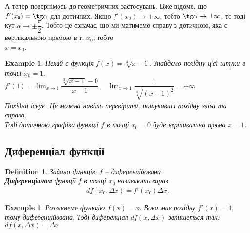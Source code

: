 \documentclass[a4paper, 14pt]{article}
\theoremstyle{theoremdd}
\theoremstyle{theoremdd}
\newtheorem{definition}[theorem]{Definition}
\theoremstyle{theoremdd}
\theoremstyle{theoremdd}
\newtheorem{example}[theorem]{Example}
\theoremstyle{theoremdd}
\theoremstyle{theoremdd}
\theoremstyle{theoremdd}
\theoremstyle{theoremdd}
\begin{document}
А тепер повернімось до геометричних застосувань. Вже відомо, що $f'(x_0) = \tg \alpha$ для дотичних. Якщо $f'(x_0) \to \pm \infty$, тобто $\tg \alpha \to \pm \infty$, то тоді кут $\alpha \to \pm \dfrac{\pi}{2}$. Тобто це означає, що ми матимемо справу з дотичною, яка є вертикальною прямою в т. $x_0$, тобто\\
$x=x_0$.

\begin{example}
Нехай є функція $f(x) = \sqrt[3]{x-1}$. Знайдемо похідну цієї штуки в точці $x_0 = 1$.\\
$f'(1) = \displaystyle \lim_{x \to 1} \dfrac{\sqrt[3]{x-1}-0}{x-1} = \lim_{x \to 1} \dfrac{1}{\sqrt[3]{(x-1)^2}} = + \infty$\\
Похідна існує. Це можна навіть перевірити, пошукавши похідну зліва та справа.\\
Тоді дотичною графіка функції $f$ в точці $x_0 = 0$ буде вертикальна пряма $x = 1$.
\\ \iffalse %
\begin{figure}[H]
\centering
{
\begin{tikzpicture}

\draw[thick, ->] (-3,0)--(3,0) node[anchor = north] {$x$};
\draw[thick, ->] (-1,-2)--(-1,2) node[anchor = east] {$y$};

\draw[red, domain=0.001:3, variable=\x, samples = 1000] plot({\x}, {((\x)^(1/3)}) node[anchor = north] {$f(x) = \sqrt[3]{x-1}$};
\draw[red, domain=-3:-0.001, variable=\x, samples = 1000] plot({\x}, {(-(-\x)^(1/3)});

\draw[thick] (0,-1)--(0,1) node[anchor = south] {$x = 1$};
\end{tikzpicture}
}
\end{figure}
\fi %
\end{example}

\subsection{Диференціал функції}
\begin{definition}
Задано функцію $f$ -- диференційована.\\
\textbf{Диференціалом} функції $f$ в точці $x_0$ називають вираз
\begin{align*}
df(x_0,\Delta x) = f'(x_0) \Delta x.
\end{align*}
\end{definition}

\begin{example}
Розглянемо функцію $f(x) = x$. Вона має похідну $f'(x) = 1$, тому диференційована. Тоді диференціал $df(x,\Delta x)$ запишеться так: $df(x,\Delta x) = \Delta x$
\end{example}
\end{document}
